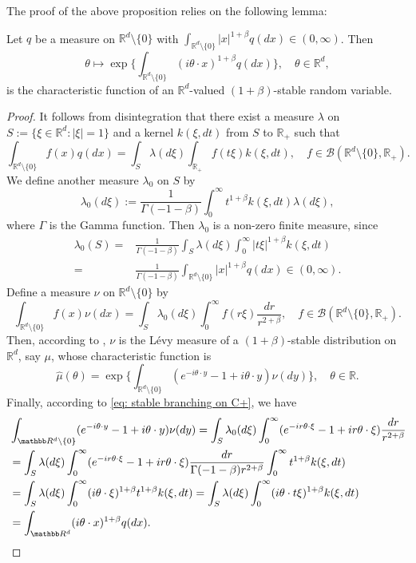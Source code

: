 \documentclass[EJP]{ejpecp} %
\begin{document}
The proof of the above proposition relies on the following lemma:
\begin{lemma}
  \label{lem: charactreisticfunction}
  Let $q$ be a measure on $\mathbb R^d\setminus\{0\}$ with
  $\int_{\mathbb R^d\setminus\{0\}} |x|^{1+\beta} q(dx) \in (0,\infty)$.
  Then
  \[
    \theta
    \mapsto  \exp\Big\{\int_{\mathbb R^d\setminus\{0\}} (i\theta \cdot x)^{1+\beta} q(dx)\Big\},
    \quad \theta \in \mathbb R^d,
  \]
  is the characteristic function of an $\mathbb R^d$-valued $(1+\beta)$-stable random variable.
\end{lemma}
\begin{proof}
  It follows from disintegration that there exist a measure $\lambda$ on $S:= \{\xi\in \mathbb R^d:|\xi| = 1\}$ and a kernel $k(\xi,dt)$ from $S$ to $\mathbb R_+$ such that
  \[
    \int_{\mathbb R^d\setminus \{0\}} f(x)q(dx)
    = \int_S \lambda(d\xi) \int_{\mathbb R_+} f(t \xi)k(\xi,dt)
    , \quad f\in \mathcal B(\mathbb R^d\setminus \{0\}, \mathbb R_+).
  \]
  We define another measure $\lambda_0$ on $S$ by
  \[
    \lambda_0(d\xi)
    := \frac1{\Gamma(-1-\beta)}\int_0^\infty t^{1+\beta}k(\xi,dt) \lambda (d\xi),
  \]
  where $\Gamma$ is the Gamma function.
  Then $\lambda_0$ is a non-zero finite measure, since
  \begin{align}
    \lambda_0(S)
      = &\frac{1}{\Gamma(-1-\beta)} \int_S \lambda (d\xi) \int_0^\infty |t\xi|^{1+\beta}k(\xi,dt) \\
   =  & \frac{1}{\Gamma(-1-\beta)} \int_{\mathbb R^d\setminus\{0\}} |x|^{1+\beta} q(dx) \in (0,\infty).
  \end{align}
  Define a measure $\nu$ on $\mathbb R^d\setminus\{0\}$ by
  \[
    \int_{\mathbb R^d\setminus\{0\}}f(x)\nu(dx)
    = \int_{S} \lambda_0(d\xi) \int_0^\infty f(r\xi) \frac{dr}{r^{2+\beta}}
    ,\quad f\in \mathcal B(\mathbb R^d\setminus \{0\}, \mathbb R_+).
  \]
  Then, according to \cite[Remark 14.4]{Sato2013Levy}, $\nu$ is the L\'evy measure of a $(1+\beta)$-stable distribution on $\mathbb R^d$, say $\mu$, whose characteristic function is
  \[
    \hat \mu(\theta)
    = \exp \Big \{ \int_{\mathbb R^d\setminus\{0\}} (e^{-i\theta \cdot y}-1+i\theta \cdot y) \nu(dy) \Big \}
    , \quad \theta \in \mathbb R.
  \]
  Finally, according to \eqref{eq: stable branching on C+}, we have
  \begin{align}
    & \int_{\mathbb R^d\setminus\{0\}} (e^{-i\theta \cdot y}-1+i\theta \cdot y) \nu(dy)
      = \int_S \lambda_0(d\xi) \int_0^\infty (e^{-ir\theta \cdot \xi}-1+ir\theta \cdot \xi) \frac{dr}{r^{2+\beta}} \\
    & = \int_S \lambda (d\xi) \int_0^\infty (e^{-ir\theta \cdot \xi}-1+ir\theta \cdot \xi) \frac{dr}{\Gamma(-1-\beta)r^{2+\beta}}\int_0^\infty t^{1+\beta} k(\xi,dt) \\
    & = \int_S \lambda (d\xi) \int_0^\infty (i\theta\cdot \xi)^{1+\beta} t^{1+\beta} k(\xi,dt)
      = \int_S \lambda(d\xi) \int_0^\infty (i\theta \cdot t\xi)^{1+\beta} k(\xi,dt) \\
    & = \int_{\mathbb R^d} (i\theta \cdot x)^{1+\beta} q(dx).
      \qedhere
  \end{align}
\end{proof}
\end{document}
